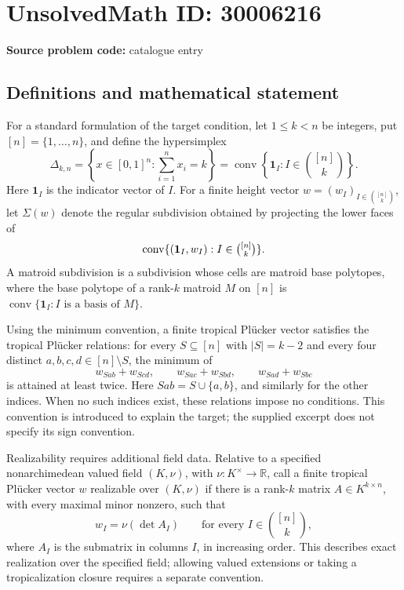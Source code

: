 \documentclass[11pt]{article}
\newcommand{\R}{\mathbb{R}}
\begin{document}
\section*{UnsolvedMath ID: 30006216}
\textbf{Source problem code:} catalogue entry
\subsection{Definitions and mathematical statement}
For a standard formulation of the target condition, let \(1\leq k<n\) be integers, put \([n]=\{1,\ldots,n\}\), and define the hypersimplex
\[
\Delta_{k,n}=\left\{x\in[0,1]^n:\sum_{i=1}^n x_i=k\right\}
=\operatorname{conv}\left\{\mathbf 1_I:I\in\binom{[n]}k\right\}.
\]
Here \(\mathbf 1_I\) is the indicator vector of \(I\). For a finite height vector \(w=(w_I)_{I\in\binom{[n]}k}\), let \(\Sigma(w)\) denote the regular subdivision obtained by projecting the lower faces of
\[
\operatorname{conv}\{(\mathbf 1_I,w_I):I\in\tbinom{[n]}k\}.
\]
A matroid subdivision is a subdivision whose cells are matroid base polytopes, where the base polytope of a rank-\(k\) matroid \(M\) on \([n]\) is \(\operatorname{conv}\{\mathbf 1_I:I\text{ is a basis of }M\}\).

Using the minimum convention, a finite tropical Pl\"ucker vector satisfies the tropical Pl\"ucker relations: for every \(S\subseteq[n]\) with \(|S|=k-2\) and every four distinct \(a,b,c,d\in[n]\setminus S\), the minimum of
\[
w_{Sab}+w_{Scd},\qquad
w_{Sac}+w_{Sbd},\qquad
w_{Sad}+w_{Sbc}
\]
is attained at least twice. Here \(Sab=S\cup\{a,b\}\), and similarly for the other indices. When no such indices exist, these relations impose no conditions. This convention is introduced to explain the target; the supplied excerpt does not specify its sign convention.

Realizability requires additional field data. Relative to a specified nonarchimedean valued field \((K,\nu)\), with \(\nu:K^\times\to\R\), call a finite tropical Pl\"ucker vector \(w\) realizable over \((K,\nu)\) if there is a rank-\(k\) matrix \(A\in K^{k\times n}\), with every maximal minor nonzero, such that
\[
w_I=\nu(\det A_I)\qquad\text{for every }I\in\binom{[n]}k,
\]
where \(A_I\) is the submatrix in columns \(I\), in increasing order. This describes exact realization over the specified field; allowing valued extensions or taking a tropicalization closure requires a separate convention.
\end{document}
